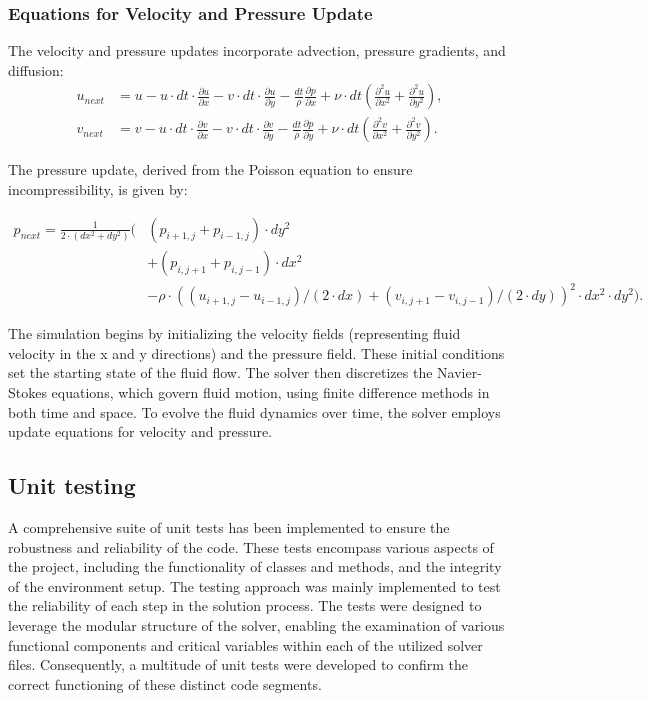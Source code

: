 \subsubsection{Equations for Velocity and Pressure Update}
The velocity and pressure updates incorporate advection, pressure gradients, and diffusion:
\begin{align}
    u_{next} &= u - u \cdot dt \cdot \frac{\partial u}{\partial x} - v \cdot dt \cdot \frac{\partial u}{\partial y} - \frac{dt}{\rho} \frac{\partial p}{\partial x} + \nu \cdot dt \left( \frac{\partial^2 u}{\partial x^2} + \frac{\partial^2 u}{\partial y^2} \right), \\
    v_{next} &= v - u \cdot dt \cdot \frac{\partial v}{\partial x} - v \cdot dt \cdot \frac{\partial v}{\partial y} - \frac{dt}{\rho} \frac{\partial p}{\partial y} + \nu \cdot dt \left( \frac{\partial^2 v}{\partial x^2} + \frac{\partial^2 v}{\partial y^2} \right).
\end{align}

The pressure update, derived from the Poisson equation to ensure incompressibility, is given by:

\begin{equation}
\begin{split}
    p_{next} = \frac{1}{2 \cdot (dx^2 + dy^2)} \bigg(& (p_{i+1, j} + p_{i-1, j}) \cdot dy^2 \\
    & + (p_{i, j+1} + p_{i, j-1}) \cdot dx^2 \\
    & - \rho \cdot \left((u_{i+1, j} - u_{i-1, j}) / (2 \cdot dx) + (v_{i, j+1} - v_{i, j-1}) / (2 \cdot dy)\right)^2 \cdot dx^2 \cdot dy^2 \bigg).
\end{split}
\end{equation}

The simulation begins by initializing the velocity fields (representing fluid velocity in the x and y directions) and the pressure field. These initial conditions set the starting state of the fluid flow. The solver then discretizes the Navier-Stokes equations, which govern fluid motion, using finite difference methods in both time and space. To evolve the fluid dynamics over time, the solver employs update equations for velocity and pressure. 

\subsection{Unit testing}

A comprehensive suite of unit tests has been implemented to ensure the robustness and reliability of the code. These tests encompass various aspects of the project, including the functionality of classes and methods, and the integrity of the environment setup. The testing approach was mainly implemented to test the reliability of each step in the solution process. The tests were designed to leverage the modular structure of the solver, enabling the examination of various functional components and critical variables within each of the utilized solver files. Consequently, a multitude of unit tests were developed to confirm the correct functioning of these distinct code segments.
\\

